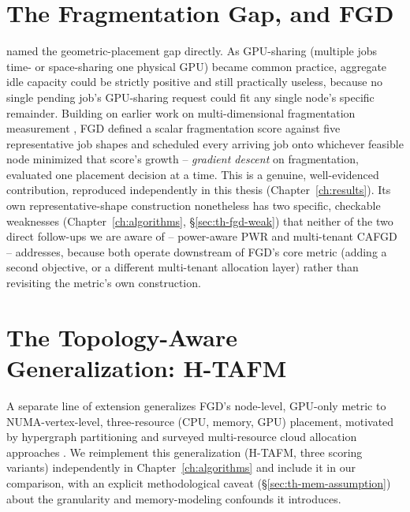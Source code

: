 \documentclass[12pt]{report}
\begin{document}
\section{The Fragmentation Gap, and FGD}
\citet{fgd2023} named the geometric-placement gap directly. As
GPU-sharing (multiple jobs time- or space-sharing one physical GPU)
became common practice, aggregate idle capacity could be strictly
positive and still practically useless, because no single pending job's
GPU-sharing request could fit any single node's specific remainder.
Building on earlier work on multi-dimensional fragmentation measurement
\citep{defrag2015}, FGD defined a scalar fragmentation score against five
representative job shapes and scheduled every arriving job onto whichever
feasible node minimized that score's growth -- \emph{gradient descent} on
fragmentation, evaluated one placement decision at a time. This is a
genuine, well-evidenced contribution, reproduced independently in this
thesis (Chapter~\ref{ch:results}). Its own representative-shape
construction nonetheless has two specific, checkable weaknesses
(Chapter~\ref{ch:algorithms}, \S\ref{sec:th-fgd-weak}) that neither of
the two direct follow-ups we are aware of -- power-aware PWR
\citep{pwr2024} and multi-tenant CAFGD \citep{cafgd2025} -- addresses,
because both operate downstream of FGD's core metric (adding a second
objective, or a different multi-tenant allocation layer) rather than
revisiting the metric's own construction.

\section{The Topology-Aware Generalization: H-TAFM}
A separate line of extension generalizes FGD's node-level, GPU-only
metric to NUMA-vertex-level, three-resource (CPU, memory, GPU) placement,
motivated by hypergraph partitioning \citep{partitioning_hard2023} and
surveyed multi-resource cloud allocation approaches
\citep{hypergraph_survey2026}. We reimplement this generalization
(H-TAFM, three scoring variants) independently in Chapter~\ref{ch:algorithms}
and include it in our comparison, with an explicit methodological caveat
(\S\ref{sec:th-mem-assumption}) about the granularity and memory-modeling
confounds it introduces.
\end{document}

